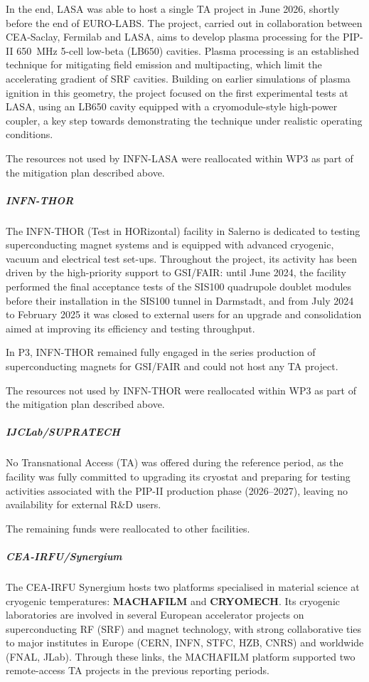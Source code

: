 In the end, LASA was able to host a single TA project in June 2026, shortly before the end of EURO-LABS. The project, carried out in collaboration between CEA-Saclay, Fermilab and LASA, aims to develop plasma processing for the PIP-II 650~MHz 5-cell low-beta (LB650) cavities. Plasma processing is an established technique for mitigating field emission and multipacting, which limit the accelerating gradient of SRF cavities. Building on earlier simulations of plasma ignition in this geometry, the project focused on the first experimental tests at LASA, using an LB650 cavity equipped with a cryomodule-style high-power coupler, a key step towards demonstrating the technique under realistic operating conditions.

The resources not used by INFN-LASA were reallocated within WP3 as part of the mitigation plan described above.

\subparagraph{INFN-THOR} \mbox{}

The INFN-THOR (Test in HORizontal) facility in Salerno is dedicated to testing superconducting magnet systems and is equipped with advanced cryogenic, vacuum and electrical test set-ups. Throughout the project, its activity has been driven by the high-priority support to GSI/FAIR: until June 2024, the facility performed the final acceptance tests of the SIS100 quadrupole doublet modules before their installation in the SIS100 tunnel in Darmstadt, and from July 2024 to February 2025 it was closed to external users for an upgrade and consolidation aimed at improving its efficiency and testing throughput.

In P3, INFN-THOR remained fully engaged in the series production of superconducting magnets for GSI/FAIR and could not host any TA project.

The resources not used by INFN-THOR were reallocated within WP3 as part of the mitigation plan described above.

\subparagraph{IJCLab/SUPRATECH} \mbox{}

No Transnational Access (TA) was offered during the reference period, as the facility was fully committed to upgrading its cryostat and preparing for testing activities associated with the PIP-II production phase (2026–2027), leaving no availability for external R\&D users.

The remaining funds were reallocated to other facilities.

\subparagraph{CEA-IRFU/Synergium} \mbox{}

The CEA-IRFU Synergium hosts two platforms specialised in material science at cryogenic temperatures: \textbf{MACHAFILM} and \textbf{CRYOMECH}. Its cryogenic laboratories are involved in several European accelerator projects on superconducting RF (SRF) and magnet technology, with strong collaborative ties to major institutes in Europe (CERN, INFN, STFC, HZB, CNRS) and worldwide (FNAL, JLab). Through these links, the MACHAFILM platform supported two remote-access TA projects in the previous reporting periods.

